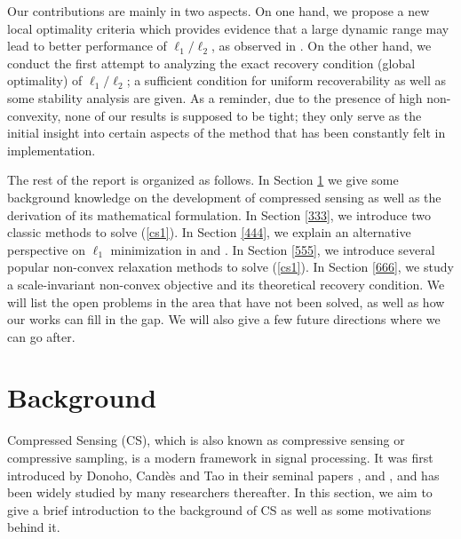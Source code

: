 \documentclass[11pt]{article}
\numberwithin{equation}{section}
\theoremstyle{plain}
\theoremstyle{definition}
\begin{document}
Our contributions are mainly in two aspects. On one hand, we propose a new local optimality criteria which provides evidence that a large dynamic range may lead to better performance of $\ell_1/\ell_2$, as observed in \cite{wang2019accelerated}. On the other hand, we conduct the first attempt to analyzing the exact recovery condition (global optimality) of $\ell_1/\ell_2$; a sufficient condition for uniform recoverability as well as some stability analysis are given. As a reminder, due to the presence of high non-convexity, none of our results is supposed to be tight; they only serve as the initial insight into certain aspects of the method that has been constantly felt in implementation. 

The rest of the report is organized as follows. In Section \ref{222} we give some background knowledge on the development of compressed sensing as well as the derivation of its mathematical formulation. In Section \ref{333}, we introduce two classic methods to solve (\ref{cs1}). In Section \ref{444}, we explain an alternative perspective on $\ell_1$ minimization in \cite{zhang2013theory} and \cite{vershynin2015estimation}. In Section \ref{555}, we introduce several popular non-convex relaxation methods to solve (\ref{cs1}). In Section \ref{666}, we study a scale-invariant non-convex objective and its theoretical recovery condition. We will list the open problems in the area that have not been solved, as well as how our works can fill in the gap. We will also give a few future directions where we can go after. 





\section{Background}\label{222}

Compressed Sensing (CS), which is also known as compressive sensing or compressive sampling, is a modern framework in signal processing. It was first introduced by Donoho, Cand\`es and Tao in their seminal papers  \cite{donoho2006compressed}, \cite{emmanuel2004robust} and \cite{candes2004near}, and has been widely studied by many researchers thereafter. In this section, we aim to give a brief introduction to the background of CS as well as some motivations behind it. 
\end{document}
